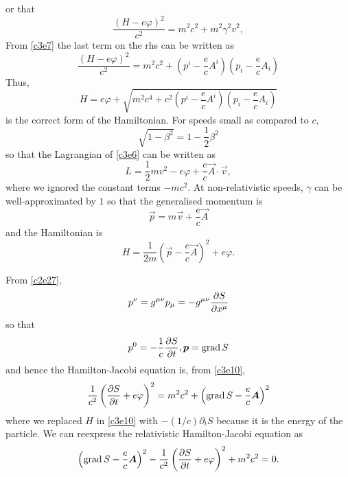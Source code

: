 \begin{enumerate}
\[\]
or that
\[
\frac{(H - e\varphi)^2}{c^2} = m^2c^2 + m^2\gamma^2 v^2,
\]
From \eqref{c3e7} the last term on the rhs can be written as
\begin{equation}\label{c3e10}
\frac{(H - e\varphi)^2}{c^2} = m^2c^2 + \left(p^i - \frac{e}{c}A^i\right)
\left(p_i - \frac{e}{c}A_i\right)
\end{equation}
Thus,
\begin{equation}\label{c3e11}
H = e\varphi + \sqrt{m^2c^4 + c^2 
\left(p^i - \frac{e}{c}A^i\right)\left(p_i - \frac{e}{c}A_i\right)}
\end{equation}
is the correct form of the Hamiltonian. For speeds small as compared to $c$,
\[
\sqrt{1 - \beta^2} = 1 - \frac{1}{2}\beta^2
\]
so that the Lagrangian of \eqref{c3e6} can be written as
\begin{equation}\label{c3e12}
L = \frac{1}{2}mv^2 - e\varphi + \frac{e}{c}\vec{A}\cdot\vec{v},
\end{equation}
where we ignored the constant terms $-mc^2$. At non-relativistic speeds, $\gamma$
can be well-approximated by $1$ so that the generalised momentum is
\begin{equation}\label{c3e13}
\vec{p} = m\vec{v} + \frac{e}{c}\vec{A}
\end{equation}
and the Hamiltonian is
\begin{equation}\label{c3e14}
H = \frac{1}{2m}\left(\vec{p} - \frac{e}{c}\vec{A}\right)^2 + e\varphi.
\end{equation}

From \eqref{c2e27},
\[
p^\nu = g^{\mu\nu}p_\mu = -g^{\mu\nu}\frac{\partial{S}}{\partial{x^\mu}}
\]
so that
\[
p^0 = -\frac{1}{c}\frac{\partial{S}}{\partial{t}}, \boldsymbol{p} = \operatorname{grad} S
\]
and hence the Hamilton-Jacobi equation is, from \eqref{c3e10},
\[
\frac{1}{c^2}\left(\frac{\partial{S}}{\partial{t}} + e\varphi\right)^2 = m^2c^2 + 
\left(\operatorname{grad} S - \frac{e}{c}\boldsymbol{A}\right)^2
\]
where we replaced $H$ in \eqref{c3e10} with $-(1/c)\partial_t S$ because it is
the energy of the particle. We can reexpress the relativistic Hamilton-Jacobi
equation as 
\begin{equation}\label{c3e15}
\left(\operatorname{grad} S - \frac{e}{c}\boldsymbol{A}\right)^2 - 
\frac{1}{c^2}\left(\frac{\partial{S}}{\partial{t}} + e\varphi\right)^2 + m^2c^2 = 0.
\end{equation}


\end{enumerate}
